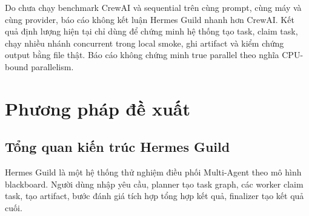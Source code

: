 \documentclass[12pt,a4paper]{article}
\begin{document}
Do chưa chạy benchmark CrewAI và sequential trên cùng prompt, cùng máy và cùng provider, báo cáo không kết luận Hermes Guild nhanh hơn CrewAI. Kết quả định lượng hiện tại chỉ dùng để chứng minh hệ thống tạo task, claim task, chạy nhiều nhánh concurrent trong local smoke, ghi artifact và kiểm chứng output bằng file thật. Báo cáo không chứng minh true parallel theo nghĩa CPU-bound parallelism.

\section{Phương pháp đề xuất}

\subsection{Tổng quan kiến trúc Hermes Guild}

Hermes Guild là một hệ thống thử nghiệm điều phối Multi-Agent theo mô hình blackboard. Người dùng nhập yêu cầu, planner tạo task graph, các worker claim task, tạo artifact, bước đánh giá tích hợp tổng hợp kết quả, finalizer tạo kết quả cuối.
\end{document}
